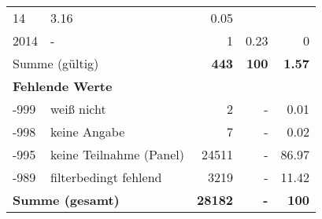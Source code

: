 \begin{longtable}{lXrrr}
       \num{14} &
       \num[round-mode=places,round-precision=2]{3,16} &
         \num[round-mode=places,round-precision=2]{0,05} \\

     2014 &
     \multicolumn{1}{X}{ -  } &


       \num{1} &
       \num[round-mode=places,round-precision=2]{0,23} &
         \num[round-mode=places,round-precision=2]{0} \\
     \midrule
     \multicolumn{2}{l}{Summe (gültig)} &
       \textbf{\num{443}} &
     \textbf{100} &
       \textbf{\num[round-mode=places,round-precision=2]{1,57}} \\
     \multicolumn{5}{l}{\textbf{Fehlende Werte}}\\
       -999 &
       weiß nicht &
         \num{2} &
        - &
         \num[round-mode=places,round-precision=2]{0,01} \\
       -998 &
       keine Angabe &
         \num{7} &
        - &
         \num[round-mode=places,round-precision=2]{0,02} \\
       -995 &
       keine Teilnahme (Panel) &
         \num{24511} &
        - &
         \num[round-mode=places,round-precision=2]{86,97} \\
       -989 &
       filterbedingt fehlend &
         \num{3219} &
        - &
         \num[round-mode=places,round-precision=2]{11,42} \\
     \midrule
     \multicolumn{2}{l}{\textbf{Summe (gesamt)}} &
          \textbf{\num{28182}} &
        \textbf{-} &
        \textbf{100} \\
     \bottomrule
     \end{longtable}
     
